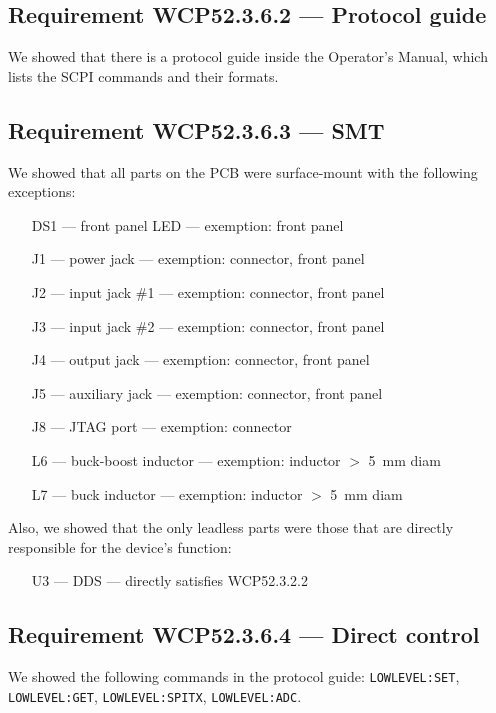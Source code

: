 \subsection*{Requirement WCP52.3.6.2 --- Protocol guide}
We showed that there is a protocol guide inside the Operator's Manual, which lists the
SCPI commands and their formats.

\subsection*{Requirement WCP52.3.6.3 --- SMT}
We showed that all parts on the PCB were surface-mount with the following exceptions:

\begin{itemize}
\item[DS1]{--- front panel LED --- exemption: front panel}
\item[J1]{--- power jack --- exemption: connector, front panel}
\item[J2]{--- input jack \#1 --- exemption: connector, front panel}
\item[J3]{--- input jack \#2 --- exemption: connector, front panel}
\item[J4]{--- output jack --- exemption: connector, front panel}
\item[J5]{--- auxiliary jack --- exemption: connector, front panel}
\item[J8]{--- JTAG port --- exemption: connector}
\item[L6]{--- buck-boost inductor --- exemption: inductor $>$ 5~mm diam}
\item[L7]{--- buck inductor --- exemption: inductor $>$ 5~mm diam}
\end{itemize}

Also, we showed that the only leadless parts were those that are directly responsible for the device's function:

\begin{itemize}
\item[U3]{--- DDS --- directly satisfies WCP52.3.2.2}
\end{itemize}

\subsection*{Requirement WCP52.3.6.4 --- Direct control}
We showed the following commands in the protocol guide: \texttt{LOWLEVEL:SET}, \texttt{LOWLEVEL:GET},
\texttt{LOWLEVEL:SPITX}, \texttt{LOWLEVEL:ADC}.

